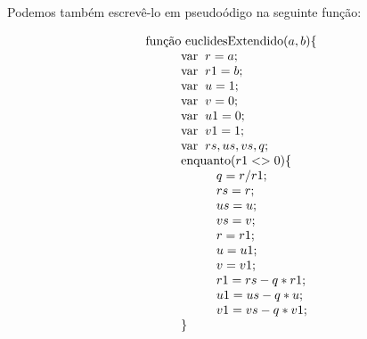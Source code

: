 Podemos tamb\'em escrev\^e-lo em pseudo\'odigo na seguinte fun\c{c}\~ao:

\[
\begin{array}{l}
\textmd{fun\c{c}\~ao  euclidesExtendido} (a, b)\{\\
\hspace{10mm} \textmd{var}\hspace{2mm} r = a;\\
\hspace{10mm} \textmd{var}\hspace{2mm} r1 = b;\\
\hspace{10mm} \textmd{var}\hspace{2mm} u = 1;\\
\hspace{10mm} \textmd{var}\hspace{2mm} v = 0;\\
\hspace{10mm} \textmd{var}\hspace{2mm} u1 = 0;\\
\hspace{10mm} \textmd{var}\hspace{2mm} v1 = 1;\\
\hspace{10mm} \textmd{var}\hspace{2mm} rs, us, vs, q;\\
\hspace{10mm} \textmd{enquanto} (r1 <> 0)\{\\
\hspace{10mm}\hspace{10mm}		q = r / r1; \\
\hspace{10mm}\hspace{10mm}		rs = r;\\
\hspace{10mm}\hspace{10mm}		us = u;\\
\hspace{10mm}\hspace{10mm}		vs = v;\\
\hspace{10mm}\hspace{10mm}		r = r1;\\
\hspace{10mm}\hspace{10mm}		u = u1;\\
\hspace{10mm}\hspace{10mm}		v = v1;\\
\hspace{10mm}\hspace{10mm}		r1 = rs - q *r1;\\
\hspace{10mm}\hspace{10mm}		u1 = us - q*u;\\
\hspace{10mm}\hspace{10mm}		v1 = vs - q*v1;\\
\hspace{10mm}	\}\\
	

\end{array}\]
